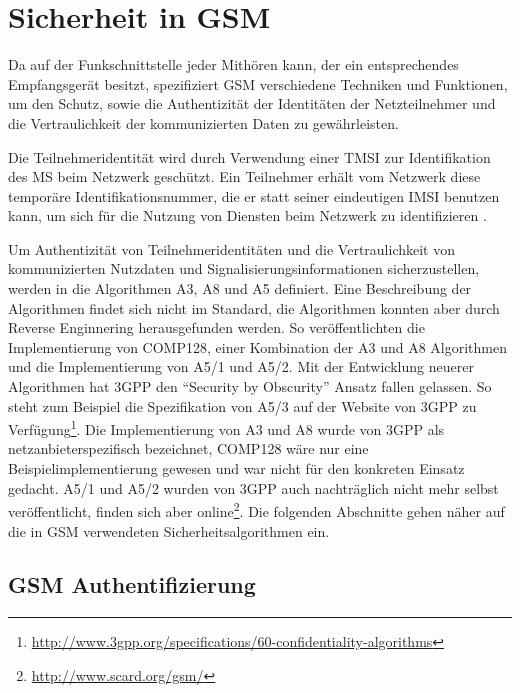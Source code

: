 \section{Sicherheit in GSM} \label{hdl:sicherheitsmechanismen-gsm_authentifizierung}


Da auf der Funkschnittstelle jeder Mithören kann, der ein entsprechendes Empfangsgerät besitzt, spezifiziert \ac{GSM} verschiedene Techniken und Funktionen, um den Schutz, sowie die Authentizität der Identitäten der Netzteilnehmer und die Vertraulichkeit der kommunizierten Daten zu gewährleisten. 

Die Teilnehmeridentität wird durch Verwendung einer \ac{TMSI} zur Identifikation des \ac{MS} beim Netzwerk geschützt. Ein Teilnehmer erhält vom Netzwerk diese temporäre Identifikationsnummer, die er statt seiner eindeutigen \ac{IMSI} benutzen kann, um sich für die Nutzung von Diensten beim Netzwerk zu identifizieren .

Um Authentizität von Teilnehmeridentitäten und die Vertraulichkeit von kommunizierten Nutzdaten und Signalisierungsinformationen sicherzustellen, werden in  die Algorithmen \ac{A3}, \ac{A8} und \ac{A5} definiert. Eine Beschreibung der Algorithmen findet sich nicht im Standard, die Algorithmen konnten aber durch Reverse Enginnering herausgefunden werden. So veröffentlichten \citet{briceno1998implementation} die Implementierung von \ac{COMP128}, einer Kombination der \ac{A3} und \ac{A8} Algorithmen und \citet{briceno1999pedagogical} die Implementierung von A5/1 und A5/2. Mit der Entwicklung neuerer Algorithmen hat \ac{3GPP} den "`Security by Obscurity"' Ansatz fallen gelassen. So steht zum Beispiel die Spezifikation von A5/3 auf der Website von \ac{3GPP} zu Verfügung\footnote{\url{http://www.3gpp.org/specifications/60-confidentiality-algorithms}}. Die Implementierung von \ac{A3} und \ac{A8} wurde von \ac{3GPP} als netzanbieterspezifisch bezeichnet, \ac{COMP128} wäre nur eine Beispielimplementierung gewesen und war nicht für den konkreten Einsatz gedacht. A5/1 und A5/2 wurden von \ac{3GPP} auch nachträglich nicht mehr selbst veröffentlicht, finden sich aber online\footnote{\url{http://www.scard.org/gsm/}}. Die folgenden Abschnitte gehen näher auf die in \ac{GSM} verwendeten Sicherheitsalgorithmen ein.

\subsection{GSM Authentifizierung} \label{hdl:authentication}


